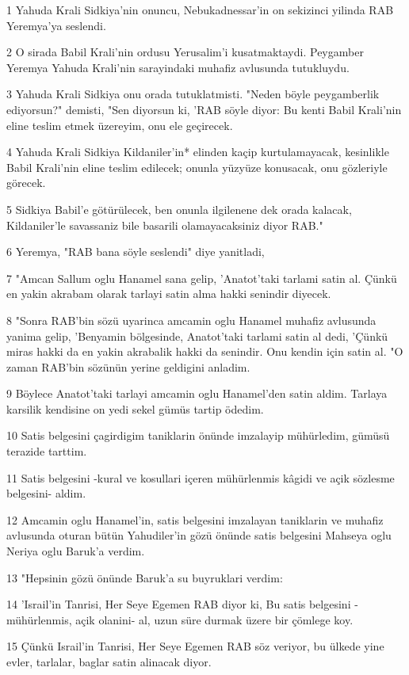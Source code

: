 \par 1 Yahuda Krali Sidkiya'nin onuncu, Nebukadnessar'in on sekizinci yilinda RAB Yeremya'ya seslendi.
\par 2 O sirada Babil Krali'nin ordusu Yerusalim'i kusatmaktaydi. Peygamber Yeremya Yahuda Krali'nin sarayindaki muhafiz avlusunda tutukluydu.
\par 3 Yahuda Krali Sidkiya onu orada tutuklatmisti. "Neden böyle peygamberlik ediyorsun?" demisti, "Sen diyorsun ki, 'RAB söyle diyor: Bu kenti Babil Krali'nin eline teslim etmek üzereyim, onu ele geçirecek.
\par 4 Yahuda Krali Sidkiya Kildaniler'in* elinden kaçip kurtulamayacak, kesinlikle Babil Krali'nin eline teslim edilecek; onunla yüzyüze konusacak, onu gözleriyle görecek.
\par 5 Sidkiya Babil'e götürülecek, ben onunla ilgilenene dek orada kalacak, Kildaniler'le savassaniz bile basarili olamayacaksiniz diyor RAB."
\par 6 Yeremya, "RAB bana söyle seslendi" diye yanitladi,
\par 7 "Amcan Sallum oglu Hanamel sana gelip, 'Anatot'taki tarlami satin al. Çünkü en yakin akrabam olarak tarlayi satin alma hakki senindir diyecek.
\par 8 "Sonra RAB'bin sözü uyarinca amcamin oglu Hanamel muhafiz avlusunda yanima gelip, 'Benyamin bölgesinde, Anatot'taki tarlami satin al dedi, 'Çünkü miras hakki da en yakin akrabalik hakki da senindir. Onu kendin için satin al. "O zaman RAB'bin sözünün yerine geldigini anladim.
\par 9 Böylece Anatot'taki tarlayi amcamin oglu Hanamel'den satin aldim. Tarlaya karsilik kendisine on yedi sekel gümüs tartip ödedim.
\par 10 Satis belgesini çagirdigim taniklarin önünde imzalayip mühürledim, gümüsü terazide tarttim.
\par 11 Satis belgesini -kural ve kosullari içeren mühürlenmis kâgidi ve açik sözlesme belgesini- aldim.
\par 12 Amcamin oglu Hanamel'in, satis belgesini imzalayan taniklarin ve muhafiz avlusunda oturan bütün Yahudiler'in gözü önünde satis belgesini Mahseya oglu Neriya oglu Baruk'a verdim.
\par 13 "Hepsinin gözü önünde Baruk'a su buyruklari verdim:
\par 14 'Israil'in Tanrisi, Her Seye Egemen RAB diyor ki, Bu satis belgesini -mühürlenmis, açik olanini- al, uzun süre durmak üzere bir çömlege koy.
\par 15 Çünkü Israil'in Tanrisi, Her Seye Egemen RAB söz veriyor, bu ülkede yine evler, tarlalar, baglar satin alinacak diyor.
